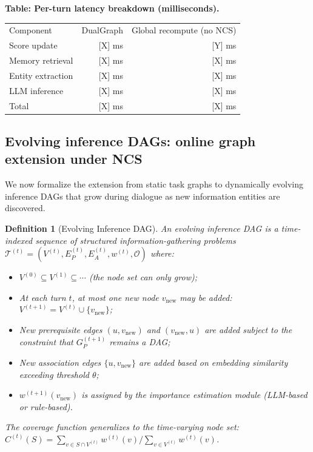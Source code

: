 \documentclass[11pt,a4paper]{article}
\newtheorem{definition}{Definition}
\newcommand{\placeholder}[1]{%
  \begin{tcolorbox}[colback=yellow!10,colframe=orange!60!black,
    fonttitle=\bfseries,title=Placeholder]
    #1
  \end{tcolorbox}%
}
\begin{document}
\placeholder{%
  \textbf{Table: Per-turn latency breakdown (milliseconds).}\\
  \begin{tabular}{lrr}
    Component & DualGraph & Global recompute (no NCS) \\
    Score update & [X] ms & [Y] ms \\
    Memory retrieval & [X] ms & [X] ms \\
    Entity extraction & [X] ms & [X] ms \\
    LLM inference & [X] ms & [X] ms \\
    Total & [X] ms & [X] ms \\
  \end{tabular}
}



\subsection{Evolving inference DAGs: online graph extension under NCS}
\label{sec:theory_evolving}

We now formalize the extension from static task graphs to dynamically evolving
inference DAGs that grow during dialogue as new information entities are
discovered.

\begin{definition}[Evolving Inference DAG]
\label{def:evolving}
An \emph{evolving inference DAG} is a time-indexed sequence of structured
information-gathering problems $\mathcal{T}^{(t)} = (V^{(t)}, E_P^{(t)},
E_A^{(t)}, w^{(t)}, \mathcal{O})$ where:
\begin{itemize}[noitemsep]
  \item $V^{(0)} \subseteq V^{(1)} \subseteq \cdots$ (the node set can
        only grow);
  \item At each turn $t$, at most one new node $v_{\mathrm{new}}$ may be
        added: $V^{(t+1)} = V^{(t)} \cup \{v_{\mathrm{new}}\}$;
  \item New prerequisite edges $(u, v_{\mathrm{new}})$ and
        $(v_{\mathrm{new}}, u)$ are added subject to the constraint that
        $G_P^{(t+1)}$ remains a DAG;
  \item New association edges $\{u, v_{\mathrm{new}}\}$ are added based on
        embedding similarity exceeding threshold $\theta$;
  \item $w^{(t+1)}(v_{\mathrm{new}})$ is assigned by the importance
        estimation module (LLM-based or rule-based).
\end{itemize}
The coverage function generalizes to the time-varying node set:
$C^{(t)}(S) = \sum_{v \in S \cap V^{(t)}} w^{(t)}(v) \big/
\sum_{v \in V^{(t)}} w^{(t)}(v)$.
\end{definition}
\end{document}
